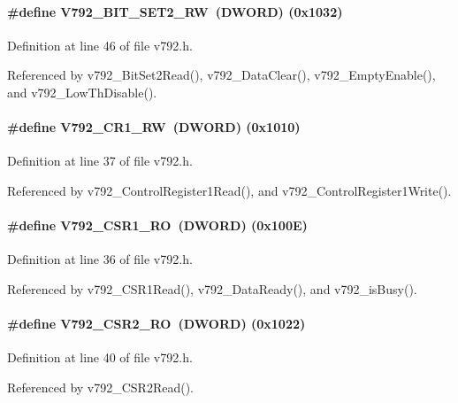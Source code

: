 \paragraph[{V792\_\-BIT\_\-SET2\_\-RW}]{\setlength{\rightskip}{0pt plus 5cm}\#define V792\_\-BIT\_\-SET2\_\-RW~({\bf DWORD}) (0x1032)}\hfill\label{v792_8h_a8b050ad92f873188c3d5da564eb439a7}


Definition at line 46 of file v792.h.

Referenced by v792\_\-BitSet2Read(), v792\_\-DataClear(), v792\_\-EmptyEnable(), and v792\_\-LowThDisable().
\paragraph[{V792\_\-CR1\_\-RW}]{\setlength{\rightskip}{0pt plus 5cm}\#define V792\_\-CR1\_\-RW~({\bf DWORD}) (0x1010)}\hfill\label{v792_8h_aabd4540cab17f463b0404db0fd9d9ae8}


Definition at line 37 of file v792.h.

Referenced by v792\_\-ControlRegister1Read(), and v792\_\-ControlRegister1Write().
\paragraph[{V792\_\-CSR1\_\-RO}]{\setlength{\rightskip}{0pt plus 5cm}\#define V792\_\-CSR1\_\-RO~({\bf DWORD}) (0x100E)}\hfill\label{v792_8h_aadfd0f73570c7b5156d924c5a0dd4734}


Definition at line 36 of file v792.h.

Referenced by v792\_\-CSR1Read(), v792\_\-DataReady(), and v792\_\-isBusy().
\paragraph[{V792\_\-CSR2\_\-RO}]{\setlength{\rightskip}{0pt plus 5cm}\#define V792\_\-CSR2\_\-RO~({\bf DWORD}) (0x1022)}\hfill\label{v792_8h_a84bb8214bac09a143f24d22fc062aed6}


Definition at line 40 of file v792.h.

Referenced by v792\_\-CSR2Read().
